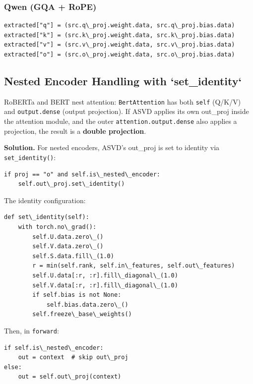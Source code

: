 \subsubsection{Qwen (GQA + RoPE)}

\begin{lstlisting}
extracted["q"] = (src.q\_proj.weight.data, src.q\_proj.bias.data)
extracted["k"] = (src.k\_proj.weight.data, src.k\_proj.bias.data)
extracted["v"] = (src.v\_proj.weight.data, src.v\_proj.bias.data)
extracted["o"] = (src.o\_proj.weight.data, src.o\_proj.bias.data)
\end{lstlisting}

\subsection{Nested Encoder Handling with `set\_identity`}

RoBERTa and BERT nest attention: \texttt{BertAttention} has both \texttt{self} (Q/K/V) 
and \texttt{output.dense} (output projection). If ASVD applies its own out\_proj 
inside the attention module, and the outer \texttt{attention.output.dense} also 
applies a projection, the result is a \textbf{double projection}.

\textbf{Solution.} For nested encoders, ASVD's out\_proj is set to identity via 
\texttt{set\_identity()}:

\begin{lstlisting}
if proj == "o" and self.is\_nested\_encoder:
    self.out\_proj.set\_identity()
\end{lstlisting}

The identity configuration:

\begin{lstlisting}
def set\_identity(self):
    with torch.no\_grad():
        self.U.data.zero\_()
        self.V.data.zero\_()
        self.S.data.fill\_(1.0)
        r = min(self.rank, self.in\_features, self.out\_features)
        self.U.data[:r, :r].fill\_diagonal\_(1.0)
        self.V.data[:r, :r].fill\_diagonal\_(1.0)
        if self.bias is not None:
            self.bias.data.zero\_()
        self.freeze\_base\_weights()
\end{lstlisting}

Then, in \texttt{forward}:

\begin{lstlisting}
if self.is\_nested\_encoder:
    out = context  # skip out\_proj
else:
    out = self.out\_proj(context)
\end{lstlisting}

